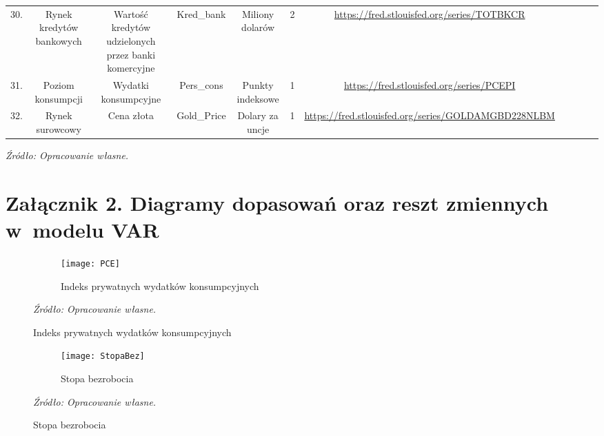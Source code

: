 \begin{landscape}
\begin{table}[h]
\begin{tabular}{|c|c|c|c|c|c|c|llll}
30.           & Rynek kredytów bankowych                         & Wartość kredytów udzielonych przez banki komercyjne & Kred\_bank                       & Miliony dolarów  &  2  & \url{https://fred.stlouisfed.org/series/TOTBKCR}           &  &  &  &  \\ \cline{1-7}
31.           & Poziom konsumpcji                                &  Wydatki konsumpcyjne                                  & Pers\_cons                       & Punkty indeksowe  & 1   & \url{https://fred.stlouisfed.org/series/PCEPI}           &  &  &  &  \\ \cline{1-7}
32.           & Rynek surowcowy                                  & Cena złota & Gold\_Price                      & Dolary za uncje      & 1 & \url{https://fred.stlouisfed.org/series/GOLDAMGBD228NLBM}  &  &  &  &  \\ \cline{1-7}
\end{tabular}
\begin{flushleft}
 \textit{\tiny{Źródło: Opracowanie własne.}} \\
\end{flushleft}
\end{table}

\end{landscape}

\newpage
\hypertarget{zal2}{}
\section*{{\large Załącznik 2. Diagramy dopasowań oraz reszt zmiennych w~modelu VAR}}

\hypertarget{fig100}{}
\begin{figure}[H]
\begin{subfigure}{.5\textwidth}
\caption{Indeks prywatnych wydatków konsumpcyjnych}
\hspace{-3cm}\texttt{[image: PCE]}
\end{subfigure}
\vspace{-0.75cm}
\begin{flushleft}
\hspace{1cm}\textit{\footnotesize{Źródło: Opracowanie własne.}} \\
\end{flushleft}
\end{figure}

\vspace{-1cm}

\hypertarget{fig101}{}
\begin{figure}[H]
\ContinuedFloat
\centering
\begin{subfigure}{.5\textwidth}
\caption{Stopa bezrobocia}
\hspace{-3cm}\texttt{[image: StopaBez]}
\end{subfigure}
\vspace{-0.75cm}
\begin{flushleft}
\hspace{1cm}\textit{\footnotesize{Źródło: Opracowanie własne.}} \\
\end{flushleft}
\end{figure}

